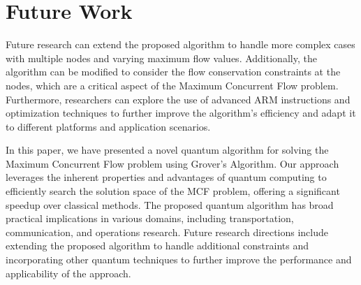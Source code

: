 \section{Future Work}

Future research can extend the proposed algorithm to handle more complex cases with multiple nodes and varying maximum flow values. Additionally, the algorithm can be modified to consider the flow conservation constraints at the nodes, which are a critical aspect of the Maximum Concurrent Flow problem. Furthermore, researchers can explore the use of advanced ARM instructions and optimization techniques to further improve the algorithm's efficiency and adapt it to different platforms and application scenarios.

In this paper, we have presented a novel quantum algorithm for solving the Maximum Concurrent Flow problem using Grover's Algorithm. Our approach leverages the inherent properties and advantages of quantum computing to efficiently search the solution space of the MCF problem, offering a significant speedup over classical methods. The proposed quantum algorithm has broad practical implications in various domains, including transportation, communication, and operations research. Future research directions include extending the proposed algorithm to handle additional constraints and incorporating other quantum techniques to further improve the performance and applicability of the approach.

